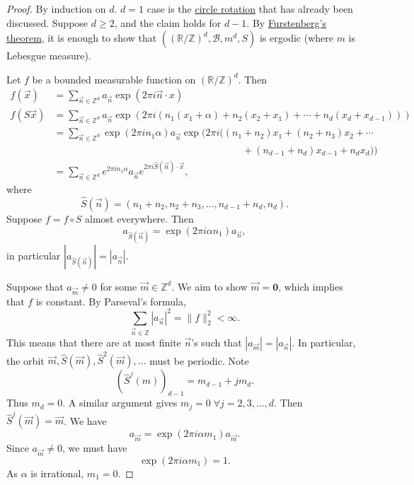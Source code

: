 \documentclass{article}
\begin{document}
\begin{proof}
  By induction on $d$. $d=1$ case is the \hyperlink{def:circ}{circle rotation} that has already been discussed.
  Suppose $d \geq 2$, and the claim holds for $d-1$.
  By \hyperlink{thm:fursskew}{Furstenberg's theorem}, it is enough to show that $((\mathbb{R}/\mathbb{Z})^d, \mathcal{B}, m^d, S)$ is ergodic (where $m$ is Lebesgue measure).

  Let $f$ be a bounded measurable function on $(\mathbb{R}/\mathbb{Z})^d$.
  Then
  \begin{align*}
    f(\vec{x}) &= \sum_{\vec{n} \in \mathbb{Z}^d} a_{\vec{n}} \exp(2\pi i \vec{n} \cdot x) \\
    f(S\vec{x}) &= \sum_{\vec{n} \in \mathbb{Z}^d} a_{\vec{n}} \exp(2\pi i(n_1(x_1+\alpha)+n_2(x_2+x_1)+\dotsb+n_d(x_d+x_{d-1}))) \\
          &=
          \sum_{\vec{n} \in \mathbb{Z}^d} \exp\left(2\pi in_1\alpha\right)a_{\vec{n}} \exp\Big(2\pi i((n_1+n_2)x_1+(n_2+n_3)x_2+\dotsb\\
          &\hspace{8cm}+(n_{d-1}+n_d)x_{d-1}+n_dx_d)\Big)\\
          &= \sum_{\vec{n} \in \mathbb{Z}^d} e^{2\pi in_1\alpha} a_{\vec{n}} e^{2\pi i \hat{S}(\vec{n}) \cdot \vec{x}},
  \end{align*}
  where
  \begin{equation*}\hat{S}(\vec{n}) = (n_1+n_2,n_2+n_3,\dotsc,n_{d-1}+n_d,n_d).\end{equation*}
  Suppose $f = f \circ S$ almost everywhere.
  Then
  \begin{equation*}a_{\hat{S}(\vec{n})} = \exp(2\pi i \alpha n_1) a_{\vec{n}},\end{equation*}
  in particular $|a_{\hat{S}(\vec{n})}| = |a_{\vec{n}}|$.

  Suppose that $a_{\vec{m}} \neq 0$ for some $\vec{m} \in \mathbb{Z}^d$.
  We aim to show $\vec{m}=\mathbf{0}$, which implies that $f$ is constant.
  By Parseval's formula,
  \begin{equation*}
  \sum_{\vec{n}\in\mathbb{Z}} |a_{\vec{n}}|^2 = \|f\|_2^2 < \infty.
  \end{equation*}
  This means that there are at most finite $\vec{n}$'s such that $|a_{\vec{m}}| = |a_{\vec{n}}|$.
  In particular, the orbit $\vec{m}, \hat{S}(\vec{m}), \hat{S}^2(\vec{m}), \dotsc$ must be periodic.
  Note
  \begin{equation*}
    \left(\hat{S}^j(m)\right)_{d-1} = m_{d-1} + jm_d.
  \end{equation*}
  Thus $m_d = 0$.
  A similar argument gives $m_j = 0\; \forall j=2,3,\dotsc,d$.
  Then $\hat{S}^j(\vec{m}) = \vec{m}$.
  We have
  \begin{equation*}
    a_{\vec{m}} = \exp(2\pi i\alpha m_1) a_{\vec{m}}.
  \end{equation*}
  Since $a_{\vec{m}} \neq 0$, we must have
  \begin{equation*}
    \exp(2\pi i \alpha m_1) = 1.
  \end{equation*}
  As $\alpha$ is irrational, $m_1 = 0$.
\end{proof}
\end{document}
